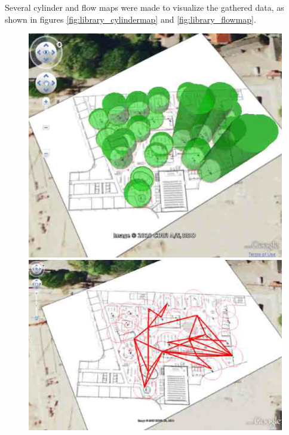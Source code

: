 Several cylinder and flow maps were made to visualize the gathered data, as shown in figures \ref{fig:library_cylindermap} and \ref{fig:library_flowmap}.

\begin{figure}[htbp] \centering
\begin{minipage}[b]{0.45\textwidth} \centering
\includegraphics[width=1.00\textwidth]{Pictures/HjoerringLibrary/library_cylinder_diagram_24Nov.png} %
\end{minipage} \hfill
\begin{minipage}[b]{0.45\textwidth} \centering
\includegraphics[width=1.00\textwidth]{Pictures/HjoerringLibrary/library_flow_Nov21.png} %

\end{minipage}
\end{figure}
